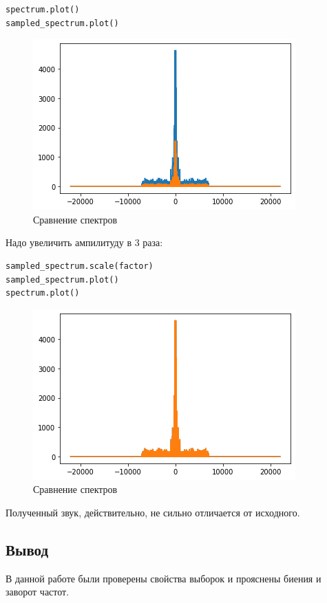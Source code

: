 \begin{lstlisting}[language=Python]
spectrum.plot()
sampled_spectrum.plot()
\end{lstlisting}
\begin{figure}[H]
	\begin{center}
		\includegraphics[scale=1]{fig/lab11/lab11_21_0.png}
		\caption{Сравнение спектров}
	\end{center}
\end{figure}

Надо увеличить ампилитуду в 3 раза:

\begin{lstlisting}[language=Python]
sampled_spectrum.scale(factor)
sampled_spectrum.plot()
spectrum.plot()
\end{lstlisting}
\begin{figure}[H]
	\begin{center}
		\includegraphics[scale=1]{fig/lab11/lab11_23_0.png}
		\caption{Сравнение спектров}
	\end{center}
\end{figure}

Полученный звук, действительно, не сильно отличается от исходного.

\subsection{Вывод}

В данной работе были проверены свойства выборок и прояснены биения и заворот частот.

